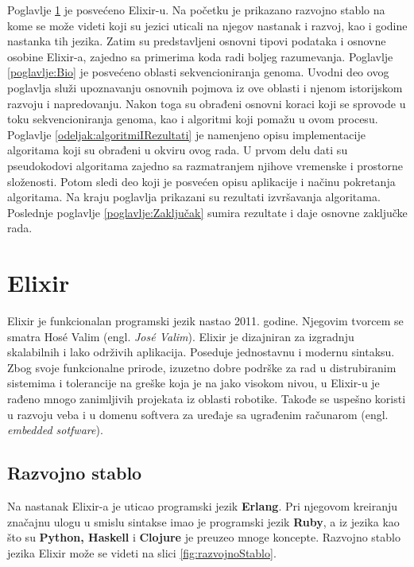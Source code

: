 \documentclass[12pt,oneside]{memoir}
\begin{document}
Poglavlje \ref{poglavlje:prvoPoglavlje} je posvećeno Elixir-u. Na početku je prikazano razvojno stablo na kome se može videti koji su jezici uticali na njegov nastanak i razvoj, kao i godine nastanka tih jezika. Zatim su predstavljeni osnovni tipovi podataka i osnovne osobine Elixir-a, zajedno sa primerima koda radi boljeg razumevanja. Poglavlje \ref{poglavlje:Bio} je posvećeno oblasti sekvencioniranja genoma. Uvodni deo ovog poglavlja služi upoznavanju osnovnih pojmova iz ove oblasti i njenom istorijskom razvoju i napredovanju. Nakon toga su obrađeni osnovni koraci koji se sprovode u toku sekvencioniranja genoma, kao i algoritmi koji pomažu u ovom procesu. Poglavlje \ref{odeljak:algoritmiIRezultati} je namenjeno opisu implementacije algoritama koji su obrađeni u okviru ovog rada. U prvom delu dati su pseudokodovi algoritama zajedno sa razmatranjem njihove vremenske i prostorne složenosti. Potom sledi deo koji je posvećen opisu aplikacije i načinu pokretanja algoritama. Na kraju poglavlja prikazani su rezultati izvršavanja algoritama. Poslednje poglavlje \ref{poglavlje:Zaključak} sumira rezultate i daje osnovne zaključke rada.

\chapter{Elixir} %
\label{poglavlje:prvoPoglavlje}

Elixir je funkcionalan programski jezik nastao 2011. godine. Njegovim tvorcem se smatra Hosé Valim (engl. \textit{José Valim}). Elixir je dizajniran za izgradnju skalabilnih i lako održivih aplikacija. Poseduje jednostavnu i modernu sintaksu. Zbog svoje funkcionalne prirode, izuzetno dobre podrške za rad u distrubiranim sistemima i tolerancije na greške koja je na jako visokom nivou, u Elixir-u je rađeno mnogo zanimljivih projekata iz oblasti robotike. Takođe se uspešno koristi u razvoju veba i u domenu softvera za uređaje sa ugrađenim računarom (engl. \textit{embedded sotfware}).



\section{Razvojno stablo}

Na nastanak Elixir-a je uticao programski jezik \textbf{Erlang}. Pri njegovom kreiranju značajnu ulogu u smislu sintakse imao je programski jezik \textbf{Ruby}, a iz jezika kao što su \textbf{Python, Haskell} i \textbf{Clojure} je preuzeo mnoge koncepte. Razvojno stablo jezika Elixir može se videti na slici \ref{fig:razvojnoStablo}. 
\end{document}

